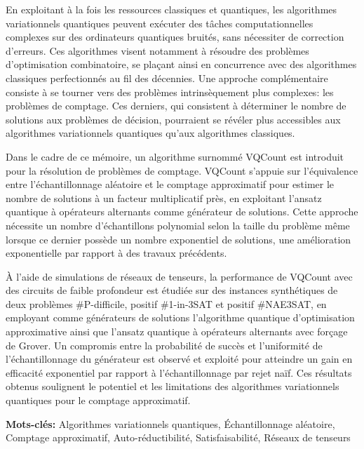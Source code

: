En exploitant à la fois les ressources classiques et quantiques, les algorithmes variationnels quantiques peuvent exécuter des tâches computationnelles complexes sur des ordinateurs quantiques bruités, sans nécessiter de correction d'erreurs. Ces algorithmes visent notamment à résoudre des problèmes d'optimisation combinatoire, se plaçant ainsi en concurrence avec des algorithmes classiques perfectionnés au fil des décennies. Une approche complémentaire consiste à se tourner vers des problèmes intrinsèquement plus complexes: les problèmes de comptage. Ces derniers, qui consistent à déterminer le nombre de solutions aux problèmes de décision, pourraient se révéler plus accessibles aux algorithmes variationnels quantiques qu'aux algorithmes classiques. 

Dans le cadre de ce mémoire, un algorithme surnommé VQCount est introduit pour la résolution de problèmes de comptage. VQCount s'appuie sur l'équivalence entre l'échantillonnage aléatoire et le comptage approximatif pour estimer le nombre de solutions à un facteur multiplicatif près, en exploitant l'ansatz quantique à opérateurs alternants comme générateur de solutions. Cette approche nécessite un nombre d'échantillons polynomial selon la taille du problème même lorsque ce dernier possède un nombre exponentiel de solutions, une amélioration exponentielle par rapport à des travaux précédents. 

À l'aide de simulations de réseaux de tenseurs, la performance de VQCount avec des circuits de faible profondeur est étudiée sur des instances synthétiques de deux problèmes \textsf{\#P}-difficile, positif \#1-in-3SAT et positif \#NAE3SAT, en employant comme générateurs de solutions l'algorithme quantique d'optimisation approximative ainsi que l'ansatz quantique à opérateurs alternants avec forçage de Grover. Un compromis entre la probabilité de succès et l'uniformité de l'échantillonnage du générateur est observé et exploité pour atteindre un gain en efficacité exponentiel par rapport à l'échantillonnage par rejet naïf. Ces résultats obtenus soulignent le potentiel et les limitations des algorithmes variationnels quantiques pour le comptage approximatif.

\noindent
\textbf{Mots-clés:} Algorithmes variationnels quantiques, Échantillonnage aléatoire, Comptage approximatif, Auto-réductibilité, Satisfaisabilité, Réseaux de tenseurs